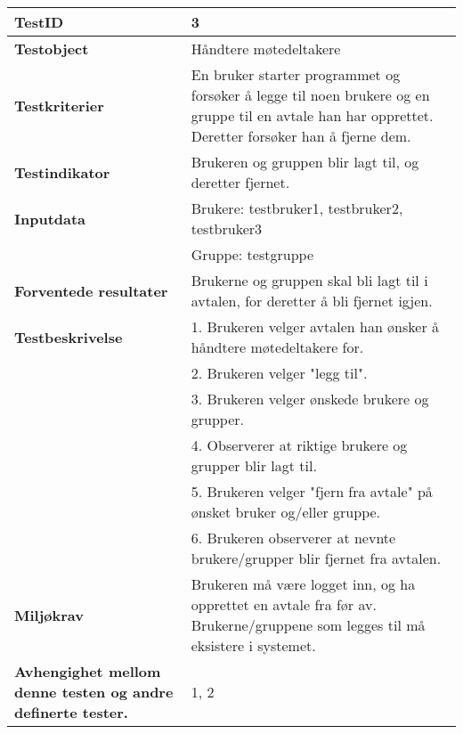 	\begin{tabularx}{1.2\textwidth}{| p{5cm} | X |}
	\hline
	\textbf{TestID} 																& 3																	\\ \hline
	\textbf{Testobject} 															& Håndtere møtedeltakere															\\ \hline
	\textbf{Testkriterier} 															& En bruker starter programmet og forsøker å legge til noen brukere og en gruppe til en avtale han har opprettet. Deretter forsøker han å fjerne dem.							\\ \hline
	\textbf{Testindikator} 															& Brukeren og gruppen blir lagt til, og deretter fjernet.												\\ \hline
	\textbf{Inputdata} 															& Brukere: testbruker1, testbruker2, testbruker3\\
																			& Gruppe: testgruppe														\\  \hline
	\textbf{Forventede resultater}									 				& Brukerne og gruppen skal bli lagt til i avtalen, for deretter å bli fjernet igjen.				\\ \hline
	\textbf{Testbeskrivelse} 														& 1. Brukeren velger avtalen han ønsker å håndtere møtedeltakere for.\\
																			& 2. Brukeren velger "legg til".\\
																			& 3. Brukeren velger ønskede brukere og grupper.\\
																			& 4. Observerer at riktige brukere og grupper blir lagt til.\\
																			& 5. Brukeren velger "fjern fra avtale" på ønsket bruker og/eller gruppe.\\
																			& 6. Brukeren observerer at nevnte brukere/grupper blir fjernet fra avtalen.					\\ \hline
	\textbf{Miljøkrav}			 												& Brukeren må være logget inn, og ha opprettet en avtale fra før av. Brukerne/gruppene som legges til må eksistere i systemet.						\\ \hline
	\textbf{Avhengighet mellom denne testen og andre definerte tester.}		 				& 1, 2				 													\\ \hline
	\end{tabularx}

\mbox{}\\

